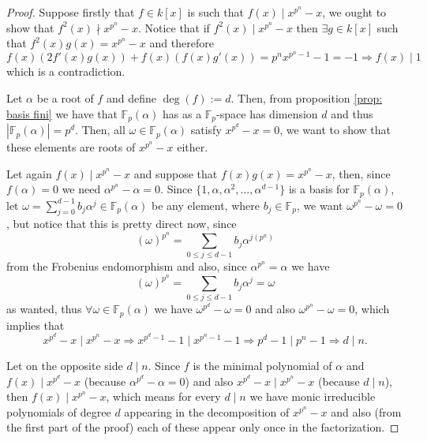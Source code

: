 \begin{proof}
   Suppose firstly that \(f \in k[x]\) is such that \(f(x) \mid x^{p^n} - x\),
   we ought to show that \(f^2(x) \nmid x^{p^n} - x\). Notice that if  \(f^2(x)
   \mid x^{p^n} - x\) then  \(\exists g \in k[x]\) such that \(f^2(x)g(x) =
   x^{p^n} - x\) and therefore 
   \[
       f(x)\left( 2f'(x)g(x)\right) + f(x) \left( f(x) g'(x) \right) = p^n
       x^{p^n - 1} - 1 = -1 \Rightarrow f(x) \mid 1
   \] 
   which is a contradiction.

   Let \(\alpha\) be a root of \(f\) and define \(\deg(f) := d\). Then, from
   proposition \ref{prop: basis fini} we have that \(\mathbb{F}_p(\alpha)\) has
   as a \(\mathbb{F}_p\)-space has dimension \(d\) and thus
   \(|\mathbb{F}_p(\alpha)| = p^d\). Then, all \(\omega \in
   \mathbb{F}_p(\alpha)\) satisfy \(x^{p^d} - x = 0\), we want to show that
   these elements are roots of \(x^{p^n} - x\) either. 

   Let again \(f(x) \mid x^{p^n} - x\) and suppose that  \(f(x)g(x) = x^{p^n} -
   x\), then, since \(f(\alpha) = 0\) we need \(\alpha^{p^n} - \alpha = 0\).
   Since \(\{1, \alpha, \alpha^2, \dots, \alpha^{d-1}\}\) is a basis for
   \(\mathbb{F}_p(\alpha)\), let \(\omega = \sum_{j=0}^{d-1} b_j \alpha^j \in
   \mathbb{F}_p(\alpha)\) be any element, where \(b_j \in \mathbb{F}_p\), we
   want \(\omega^{p^n} - \omega = 0\), but notice that this is pretty direct
   now, since
    \[
       (\omega)^{p^n} = \sum_{0 \leqslant j \leqslant d-1} b_j \alpha^{j(p^n)}
   \] 
   from the Frobenius endomorphism and also, since \(\alpha^{p^n} = \alpha\) we
   have 
    \[
       (\omega)^{p^n} = \sum_{0 \leqslant j \leqslant d-1} b_j \alpha^j = \omega
   \] 
   as wanted, thus \(\forall \omega \in \mathbb{F}_p(\alpha)\) we have
   \(\omega^{p^d} - \omega = 0\) and also  \(\omega^{p^n} - \omega = 0\), which
   implies that  
   \[
      x^{p^d} - x \mid x^{p^n} - x \Rightarrow x^{p^d - 1} - 1 \mid
      x^{p^n - 1} - 1 \Rightarrow p^d - 1 \mid p^n - 1
      \Rightarrow d \mid n.
   \]

   Let on the opposite side \(d \mid n\). Since \(f\) is the minimal polynomial
   of \(\alpha\) and \(f(x) \mid x^{p^d} - x\) (because \(\alpha^{p^d} -
   \alpha = 0\)) and also \(x^{p^d} - x \mid x^{p^n} - x\) (because \(d \mid
   n\)), then \(f(x) \mid x^{p^n} - x\), which means for every \(d \mid n\) we
   have monic irreducible polynomials of degree \(d\) appearing in the
   decomposition of \(x^{p^n} - x\) and also (from the first part of the proof)
   each of these appear only once in the factorization.
\end{proof}

